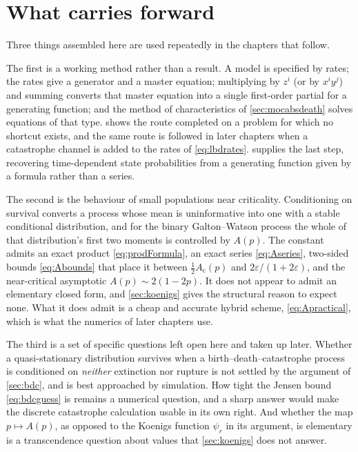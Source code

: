 \section{What carries forward}
\label{sec:outlook}

Three things assembled here are used repeatedly in the chapters that follow.

The first is a working method rather than a result. A model is specified by rates; the
rates give a generator and a master equation; multiplying by $z^i$ (or by $x^iy^j$) and
summing converts that master equation into a single first-order partial \de{} for a
generating function; and the method of characteristics of \cref{sec:mocabsdeath} solves
equations of that type.  shows the route completed on a problem for which no
shortcut exists, and the same route is followed in later chapters when a catastrophe
channel is added to the rates of \cref{eq:lbdrates}.  supplies the last
step, recovering time-dependent state probabilities from a generating function given by a
formula rather than a series.

The second is the behaviour of small populations near criticality. Conditioning on survival
converts a process whose mean is uninformative into one with a stable conditional
distribution, and for the binary Galton--Watson process the whole of that distribution's
first two moments is controlled by $A(p)$. The constant admits an exact product
\cref{eq:prodFormula}, an exact series \cref{eq:Aseries}, two-sided bounds
\cref{eq:Abounds} that place it between $\tfrac12A_{\text{c}}(p)$ and
$2\varepsilon/(1+2\varepsilon)$, and the near-critical asymptotic $A(p)\sim2(1-2p)$. It
does not appear to admit an elementary closed form, and \cref{sec:koenigs} gives the
structural reason to expect none. What it does admit is a cheap and accurate hybrid scheme,
\cref{eq:Apractical}, which is what the numerics of later chapters use.

The third is a set of specific questions left open here and taken up later. Whether a
quasi-stationary distribution survives when a birth--death--catastrophe process is
conditioned on \emph{neither} extinction nor rupture is not settled by the argument of
\cref{sec:bdc}, and is best approached by simulation. How tight the Jensen bound
\cref{eq:bdcguess} is remains a numerical question, and a sharp answer would make the
discrete catastrophe calculation usable in its own right. And whether the map
$p\mapsto A(p)$, as opposed to the Koenigs function $\psi_r$ in its argument, is elementary
is a transcendence question about values that \cref{sec:koenigs} does not answer.

\FloatBarrier
